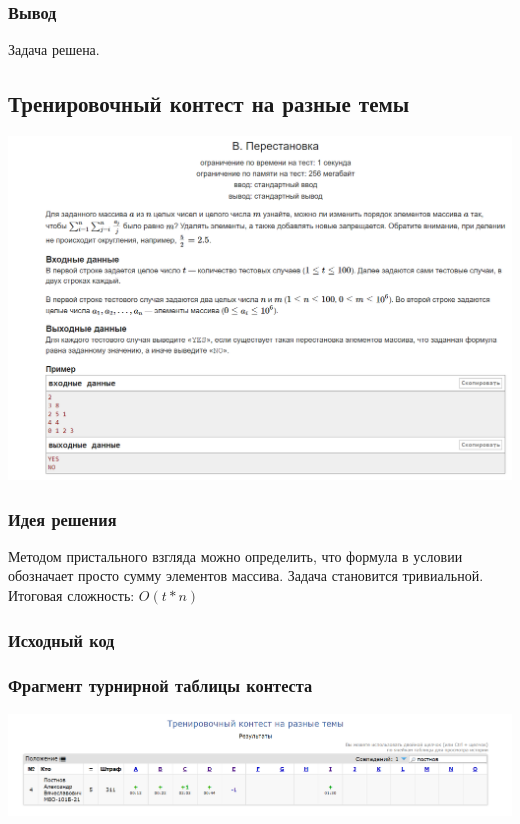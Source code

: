 \subsubsection*{Вывод}
Задача решена.

\vspace{20pt}

\pagebreak

\subsection*{Тренировочный контест на разные темы}
\begin{center}
\includegraphics[width=\textwidth]{statements/12.png}
\end{center}
\subsubsection*{Идея решения}
Методом пристального взгляда можно определить, что формула в условии обозначает просто сумму элементов массива. Задача становится тривиальной. Итоговая сложность: $O(t*n)$
\subsubsection*{Исходный код}


\subsubsection*{Фрагмент турнирной таблицы контеста}
\begin{center}
\includegraphics[width=\textwidth]{standings/12.png}\newline\noindent
\end{center}

